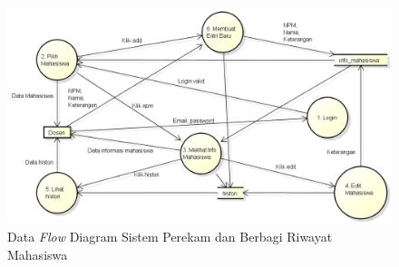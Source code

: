\begin{enumerate}[(1)]
\begin{figure}[p]
\centering
\includegraphics[scale=0.5]{Gambar/dfdl1.png}
\caption[Data {\it Flow} Diagram Sistem Perekam dan Berbagi Riwayat Mahasiswa]{Data {\it Flow}
Diagram Sistem Perekam dan Berbagi Riwayat Mahasiswa}
\label{fig:dfdl1}
\end{figure}


\end{enumerate}
